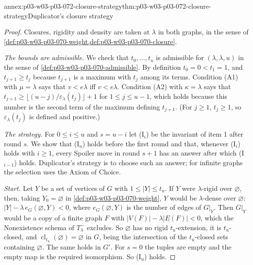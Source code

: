 \begin{annexitem}{annex:p03-w03-p03-072-closure-strategy}{thm:p03-w03-p03-072-closure-strategy}{Duplicator's closure strategy}
\begin{proof}
Closures, rigidity and density are taken at \(\lambda\) in both graphs, in
the sense of \cref{def:p03-w03-p03-070-weight,def:p03-w03-p03-070-closure}.

\emph{The bounds are admissible.}  We check that \(t_0,\ldots,t_u\) is
admissible for \((\lambda,\lambda,u)\) in the sense of
\cref{def:p03-w03-p03-070-admissible}.  By definition \(t_0=0<t_1=1\), and
\(t_{j+1}\geq t_j\) because \(t_{j+1}\) is a maximum with \(t_j\) among its
terms.  Condition (A1) with \(\mu=\lambda\) says that \(v<e\lambda\) iff
\(v<e\lambda\).  Condition (A2) with \(\kappa=\lambda\) says that
\(t_{j+1}\geq\lfloor(u-j)/\varepsilon_\lambda(t_j)\rfloor+1\) for
\(1\leq j\leq u-1\), which holds because this number is the second term of
the maximum defining \(t_{j+1}\).  (For \(j\geq1\), \(t_j\geq1\), so
\(\varepsilon_\lambda(t_j)\) is defined and positive.)

\emph{The strategy.}  For \(0\leq i\leq u\) and \(s=u-i\) let (I\(_i\)) be the
invariant of item 1 after round \(s\).  We show that (I\(_u\)) holds before
the first round and that, whenever (I\(_i\)) holds with \(i\geq1\), every
Spoiler move in round \(s+1\) has an answer after which (I\(_{i-1}\)) holds.
Duplicator's strategy is to choose such an answer; for infinite graphs the
selection uses the Axiom of Choice.

\emph{Start.}  Let \(Y\) be a set of vertices of \(G\) with
\(1\leq|Y|\leq t_u\).  If \(Y\) were \(\lambda\)-rigid over \(\varnothing\),
then, taking \(Y_0=\varnothing\) in \cref{def:p03-w03-p03-070-weight}, \(Y\)
would be \(\lambda\)-dense over \(\varnothing\):
\(|Y|-\lambda\,e_G(\varnothing,Y)<0\), where \(e_G(\varnothing,Y)\) is the
number of edges of \(G|_Y\).  Then \(G|_Y\) would be a copy of a finite graph
\(F\) with \(|V(F)|-\lambda|E(F)|<0\), which the Nonexistence schema of
\(T^-_\lambda\) excludes.  So \(\varnothing\) has no rigid
\(t_u\)-extension, it is \(t_u\)-closed, and
\(\operatorname{cl}_{t_u}(\varnothing)=\varnothing\) in \(G\), being the
intersection of the \(t_u\)-closed sets containing \(\varnothing\).  The same
holds in \(G'\).  For \(s=0\) the tuples are empty and the empty map is the
required isomorphism.  So (I\(_u\)) holds.


\end{proof}
\end{annexitem}
